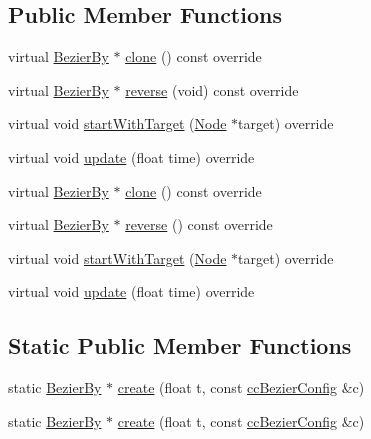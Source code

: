 \subsection*{Public Member Functions}
\begin{DoxyCompactItemize}
\item 
virtual \hyperlink{classBezierBy}{Bezier\+By} $\ast$ \hyperlink{classBezierBy_a38e476c4def21766d8592a864813dcfe}{clone} () const override
\item 
virtual \hyperlink{classBezierBy}{Bezier\+By} $\ast$ \hyperlink{classBezierBy_a6b767fe2cddd49ad43cc2724684e3810}{reverse} (void) const override
\item 
virtual void \hyperlink{classBezierBy_a3a68011f000b7f0ad58668b3ec0f7494}{start\+With\+Target} (\hyperlink{classNode}{Node} $\ast$target) override
\item 
virtual void \hyperlink{classBezierBy_a99520417807192413ef4a3eca76682b8}{update} (float time) override
\item 
virtual \hyperlink{classBezierBy}{Bezier\+By} $\ast$ \hyperlink{classBezierBy_a23998a4d8a7df8df06a00decd6e3b38b}{clone} () const override
\item 
virtual \hyperlink{classBezierBy}{Bezier\+By} $\ast$ \hyperlink{classBezierBy_ac773db6f4fd27c351c6d4c2c7929b4e7}{reverse} () const override
\item 
virtual void \hyperlink{classBezierBy_af09cb1b4ced8b91c0e87f74bf844427b}{start\+With\+Target} (\hyperlink{classNode}{Node} $\ast$target) override
\item 
virtual void \hyperlink{classBezierBy_a2f097a33bf957da1f466896735e3c094}{update} (float time) override
\end{DoxyCompactItemize}
\subsection*{Static Public Member Functions}
\begin{DoxyCompactItemize}
\item 
static \hyperlink{classBezierBy}{Bezier\+By} $\ast$ \hyperlink{classBezierBy_adc16945f587b0e7850106751d8f5eaef}{create} (float t, const \hyperlink{struct__ccBezierConfig}{cc\+Bezier\+Config} \&c)
\item 
static \hyperlink{classBezierBy}{Bezier\+By} $\ast$ \hyperlink{classBezierBy_ab2e8aa132f37688fbbc9822139df2063}{create} (float t, const \hyperlink{struct__ccBezierConfig}{cc\+Bezier\+Config} \&c)
\end{DoxyCompactItemize}

